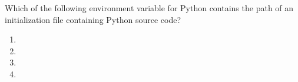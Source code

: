 \question
Which of the following environment variable for Python contains the path of an initialization file containing Python source code?

\begin{enumerate}
\item \lstinline@PYTHONPATH@
\item \lstinline@PYTHONSTARTUP@
\item \lstinline@PYTHONCASEOK@
\item \lstinline@PYTHONHOME@
\end{enumerate}

